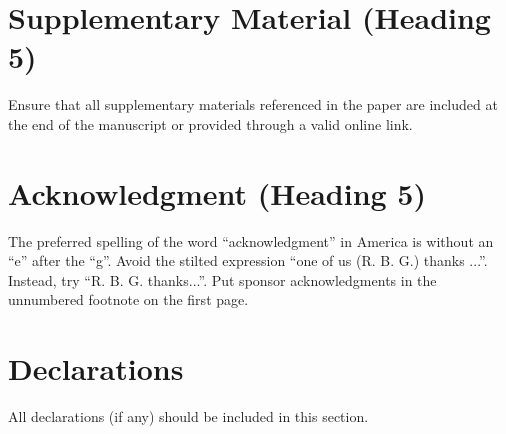 \documentclass[conference, letterpaper]{IEEEtran}
\begin{document}
\section*{Supplementary Material (Heading 5)}
Ensure that all supplementary materials referenced in the paper are included at the end of the manuscript or provided through a valid online link.

\section*{Acknowledgment (Heading 5)}
The preferred spelling of the word “acknowledgment” in America is without an “e” after the “g”. Avoid the stilted expression “one of us (R. B. G.) thanks ...”.  Instead, try “R. B. G. thanks...”. Put sponsor acknowledgments in the unnumbered footnote on the first page.

\section*{Declarations}
All declarations (if any) should be included in this section.



%
%
%
\end{document}

